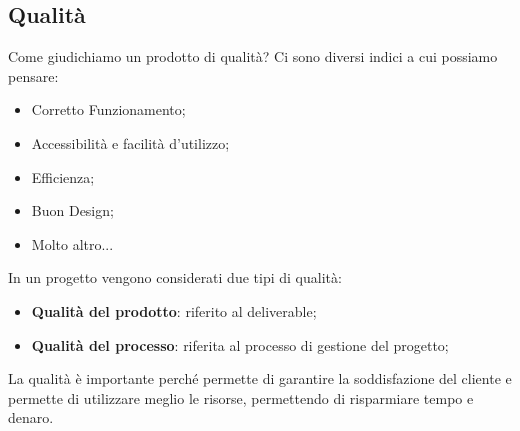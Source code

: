 \subsection{Qualità}
Come giudichiamo un prodotto di qualità? Ci sono diversi indici a cui possiamo pensare:
\begin{itemize}
	\item Corretto Funzionamento;
	\item Accessibilità e facilità d'utilizzo;
	\item Efficienza;
	\item Buon Design;
	\item Molto altro...
\end{itemize}
In un progetto vengono considerati due tipi di qualità:
\begin{itemize}
	\item \textbf{Qualità del prodotto}: riferito al deliverable;
	\item \textbf{Qualità del processo}: riferita al processo di gestione del progetto;
\end{itemize}
La qualità è importante perché permette di garantire la soddisfazione del cliente e permette di utilizzare meglio le risorse, permettendo di risparmiare tempo e denaro.
